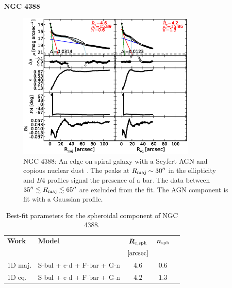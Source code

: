 \documentclass[preprint2]{emulateapj}
\newcommand{\fitfigurewidth}{0.8\textwidth}
\begin{document}
  \clearpage\newpage\noindent
  {\bf NGC 4388 \\}

  \begin{figure}[h]
  \begin{center}
  \includegraphics[width=\fitfigurewidth]{n4388_1Dfit.eps}
  \caption{NGC 4388: 
  An edge-on spiral galaxy with a Seyfert AGN \citep{veroncettyveron2006} 
  and copious nuclear dust \citep{martini2003}.
  The peaks at $R_{\rm maj} \sim 30''$ in the ellipticity and $B4$ profiles signal the presence of a bar.
  The data between $35'' \lesssim R_{\rm maj} \lesssim 65''$ are excluded from the fit.
  The AGN component is fit with a Gaussian profile.
  }
  \end{center}
  \end{figure}

  \begin{table}[h]
  \small
  \caption{Best-fit parameters for the spheroidal component of NGC 4388.}
  \begin{center}
  \begin{tabular}{llccc}
  \hline
  {\bf Work} & {\bf Model}   & $\bm R_{\rm e,sph}$    & $\bm n_{\rm sph}$ \\
    &  &  $[\rm arcsec]$ & \\
  \hline
  1D maj. & S-bul + e-d + F-bar + G-n & $4.6$  &  $0.6$ \\
  1D eq.  & S-bul + e-d + F-bar + G-n & $4.2$  &  $1.3$ \\
  \hline
  \end{tabular}
  \end{center}
  \label{tab:n4388}
  \end{table}
\end{document}
